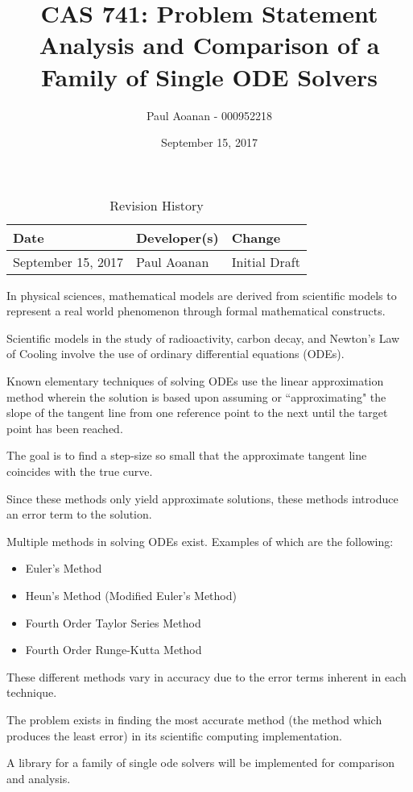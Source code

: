 \documentclass{article}
\title{CAS 741: Problem Statement\\Analysis and Comparison of a Family of Single ODE Solvers}
\author{Paul Aoanan - 000952218}
\date{September 15, 2017}
\begin{document}
\maketitle

\begin{table}[hp]
\caption{Revision History} \label{TblRevisionHistory}
\begin{tabularx}{\textwidth}{llX}
\toprule
\textbf{Date} & \textbf{Developer(s)} & \textbf{Change}\\
\midrule
September 15, 2017 & Paul Aoanan & Initial Draft\\
\bottomrule
\end{tabularx}
\end{table}

In physical sciences, mathematical models are derived from scientific models to represent a real world phenomenon through formal mathematical constructs.

Scientific models in the study of radioactivity, carbon decay, and Newton's Law of Cooling
involve the use of ordinary differential equations (ODEs).

Known elementary techniques of solving ODEs use the linear approximation method wherein the
solution is based upon assuming or ``approximating" the slope of the tangent line from one
reference point to the next until the target point has been reached.

The goal is to find a step-size so small that the approximate tangent line coincides
with the true curve.

Since these methods only yield approximate solutions, these methods introduce an error term to
the solution.

Multiple methods in solving ODEs exist.
Examples of which are the following:
\begin{itemize}
	\item Euler's Method
	\item Heun's Method (Modified Euler's Method)
	\item Fourth Order Taylor Series Method
	\item Fourth Order Runge-Kutta Method
\end{itemize}

These different methods vary in accuracy due to the error terms inherent in each technique.

The problem exists in finding the most accurate method (the method which produces the least error) in its scientific computing implementation.

A library for a family of single ode solvers will be implemented for comparison and analysis.




\end{document}
